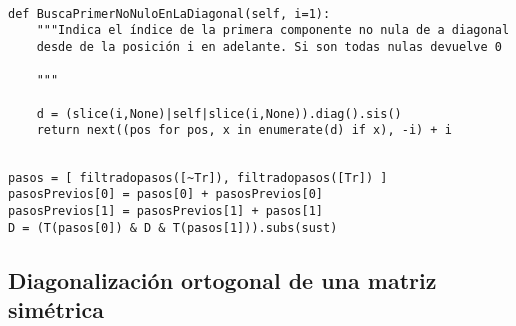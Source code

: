 \documentclass[11pt]{report}
\begin{document}
\begin{verbatim}

def BuscaPrimerNoNuloEnLaDiagonal(self, i=1):
    """Indica el índice de la primera componente no nula de a diagonal
    desde de la posición i en adelante. Si son todas nulas devuelve 0

    """
    
    d = (slice(i,None)|self|slice(i,None)).diag().sis()
    return next((pos for pos, x in enumerate(d) if x), -i) + i

\end{verbatim}


\begin{verbatim}

pasos = [ filtradopasos([~Tr]), filtradopasos([Tr]) ]
pasosPrevios[0] = pasos[0] + pasosPrevios[0]
pasosPrevios[1] = pasosPrevios[1] + pasos[1]
D = (T(pasos[0]) & D & T(pasos[1])).subs(sust)

\end{verbatim}

\subsection{Diagonalización ortogonal de una matriz simétrica}
\label{sec:org3758872}
\end{document}
